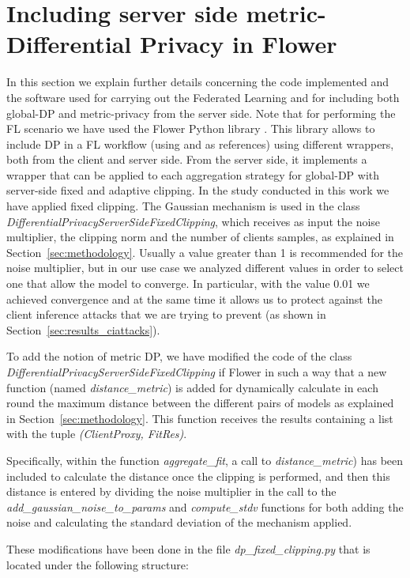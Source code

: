 \documentclass[5p,times]{elsarticle}
\begin{document}
\section{Including server side metric-Differential Privacy in Flower}\label{sec:flwr}

In this section we explain further details concerning the code implemented and the software used for carrying out the Federated Learning and for including both global-DP and metric-privacy from the server side. Note that for performing the FL scenario we have used the Flower Python library \cite{beutel2020flower}. This library allows to include DP in a FL workflow (using \cite{geyer2017differentially} and \cite{mcmahan2017learning} as references) using different wrappers, both from the client and server side. From the server side, it implements a wrapper that can be applied to each aggregation strategy for global-DP with server-side fixed and adaptive clipping. In the study conducted in this work we have applied fixed clipping. The Gaussian mechanism is used in the class \textit{DifferentialPrivacyServerSideFixedClipping}, which receives as input the noise multiplier, the clipping norm and the number of clients samples, as explained in Section~\ref{sec:methodology}. Usually a value greater than 1 is recommended for the noise multiplier, but in our use case we analyzed different values in order to select one that allow the model to converge. In particular, with the value 0.01 we achieved convergence and at the same time it allows us to protect against the client inference attacks that we are trying to prevent (as shown in Section~\ref{sec:results_ciattacks}). 

To add the notion of metric DP, we have modified the code of the class \textit{DifferentialPrivacyServerSideFixedClipping} if Flower in such a way that a new function (named \textit{distance\_metric}) is added for dynamically calculate in each round the maximum distance between the different pairs of models as explained in Section~\ref{sec:methodology}. This function receives the results containing a list with the tuple \textit{(ClientProxy, FitRes)}.

Specifically, within the function \textit{aggregate\_fit}, a call to \textit{distance\_metric}) has been included to calculate the distance once the clipping is performed, and then this distance is entered by dividing the noise multiplier in the call to the \textit{add\_gaussian\_noise\_to\_params} and \textit{compute\_stdv} functions for both adding the noise and calculating the standard deviation of the mechanism applied.

These modifications have been done in the file \textit{dp\_fixed\_clipping.py} that is located under the following structure:

\newpage
{}
\end{document}
